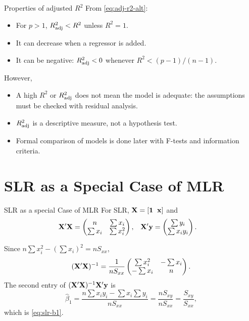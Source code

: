 \begin{frame}{Properties of adjusted $R^2$}
    From \eqref{eq:adj-r2-alt}:
    \begin{itemize}
        \item For $p>1$, $R^2_{\mathrm{adj}} < R^2$ unless $R^2=1$.
        \item It can decrease when a regressor is added.
        \item It can be negative: $R^2_{\mathrm{adj}}<0$ whenever $R^2 < (p-1)/(n-1)$.
    \end{itemize}

    \svspace{1em}
    
    However,
    \begin{itemize}
        \item A high $R^2$ or $R^2_{\mathrm{adj}}$ does not mean the model is adequate: the assumptions must be checked with residual analysis.
        \item $R^2_{\mathrm{adj}}$ is a descriptive measure, not a hypothesis test.
        \item Formal comparison of models is done later with F-tests and information criteria.
    \end{itemize}
\end{frame}


\section{SLR as a Special Case of MLR}


\begin{frame}[allowframebreaks]{SLR as a special Case of MLR}
    For SLR, $\mathbf{X} = [\mathbf{1}\;\; \mathbf{x}]$ and
    \begin{align*}
        \mathbf{X}'\mathbf{X} &= \begin{pmatrix} n & \sum x_i \\ \sum x_i & \sum x_i^2 \end{pmatrix}, &
        \mathbf{X}'\mathbf{y} &= \begin{pmatrix} \sum y_i \\ \sum x_i y_i \end{pmatrix}.
    \end{align*}

    \framebreak

    Since $n\sum x_i^2 - (\sum x_i)^2 = nS_{xx}$,
    \[
    (\mathbf{X}'\mathbf{X})^{-1} = \frac{1}{nS_{xx}}\begin{pmatrix} \sum x_i^2 & -\sum x_i \\ -\sum x_i & n \end{pmatrix}.
    \]
    The second entry of $(\mathbf{X}'\mathbf{X})^{-1}\mathbf{X}'\mathbf{y}$ is
    \[
    \hat\beta_1 = \frac{n\sum x_i y_i - \sum x_i\sum y_i}{nS_{xx}} = \frac{nS_{xy}}{nS_{xx}} = \frac{S_{xy}}{S_{xx}},
    \]
    which is \eqref{eq:slr-b1}.
\end{frame}


